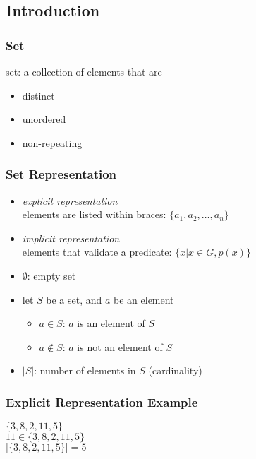 \documentclass[dvipsnames]{beamer}
\begin{document}
\subsection{Introduction}

\begin{frame}
  \frametitle{Set}

  \begin{definition}
    \alert{set}: a collection of elements that are
    \begin{itemize}
      \item distinct
      \item unordered
      \item non-repeating
    \end{itemize}
  \end{definition}
\end{frame}

\begin{frame}
  \frametitle{Set Representation}

  \begin{itemize}
    \item \emph{explicit representation}\\
      elements are listed within braces: $\{a_1,a_2,\dots,a_n\}$

    \pause
    \medskip
    \item \emph{implicit representation}\\
      elements that validate a predicate: $\{x | x \in G, p(x)\}$

    \pause
    \medskip
    \item $\emptyset$: empty set

    \pause
    \medskip
    \item let $S$ be a set, and $a$ be an element
    \begin{itemize}
      \item $a \in S$: $a$ is an element of $S$
      \item $a \notin S$: $a$ is not an element of $S$
    \end{itemize}

    \pause
    \medskip
    \item $|S|$: number of elements in $S$ (\alert{cardinality})
  \end{itemize}
\end{frame}

\begin{frame}
  \frametitle{Explicit Representation Example}

  \begin{example}
    $\{3,8,2,11,5\}$\\
    $11 \in \{3,8,2,11,5\}$\\
    $|\{3,8,2,11,5\}|=5$
  \end{example}
\end{frame}
\end{document}
